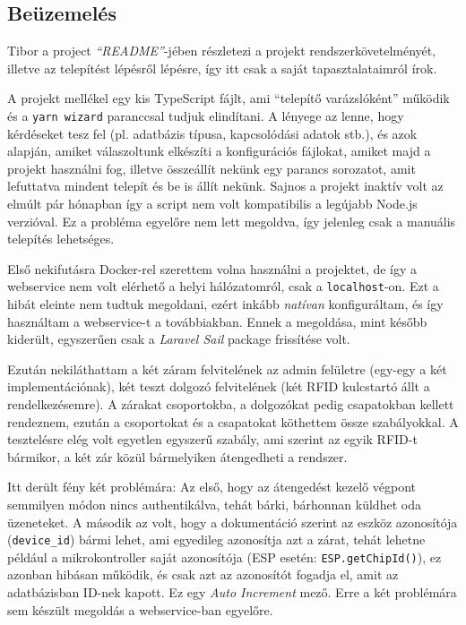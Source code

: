 \documentclass[
]{thesis-ekf}
\theoremstyle{definition}
\theoremstyle{remark}
\begin{document}
\subsection{Beüzemelés}
Tibor a project \emph{\enquote{README}}-jében részletezi a projekt rendszerkövetelményét, illetve az telepítést lépésről lépésre, így itt csak a saját tapasztalataimról írok.

A projekt mellékel egy kis TypeScript fájlt, ami \enquote{telepítő varázslóként} működik és a \texttt{yarn wizard} paranccsal tudjuk elindítani. A lényege az lenne, hogy kérdéseket tesz fel (pl. adatbázis típusa, kapcsolódási adatok stb.), és azok alapján, amiket válaszoltunk elkészíti a konfigurációs fájlokat, amiket majd a projekt használni fog, illetve összeállít nekünk egy parancs sorozatot, amit lefuttatva mindent telepít és be is állít nekünk. \cite{webservice-install} Sajnos a projekt inaktív volt az elmúlt pár hónapban így a script nem volt kompatibilis a legújabb Node.js verzióval. Ez a probléma egyelőre nem lett megoldva, így jelenleg csak a manuális telepítés lehetséges.

Első nekifutásra Docker-rel szerettem volna használni a projektet, de így a webservice nem volt elérhető a helyi hálózatomról, csak a \texttt{localhost}-on. Ezt a hibát eleinte nem tudtuk megoldani, ezért inkább \emph{natívan} konfiguráltam, és így használtam a webservice-t a továbbiakban. Ennek a megoldása, mint később kiderült, egyszerűen csak a \emph{Laravel Sail} package frissítése volt.

Ezután nekiláthattam a két záram felvitelének az admin felületre (egy-egy a két implementációnak), két teszt dolgozó felvitelének (két RFID kulcstartó állt a rendelkezésemre). A zárakat csoportokba, a dolgozókat pedig csapatokban kellett rendeznem, ezután a csoportokat és a csapatokat köthettem össze szabályokkal. A tesztelésre elég volt egyetlen egyszerű szabály, ami szerint az egyik RFID-t bármikor, a két zár közül bármelyiken átengedheti a rendszer.

Itt derült fény két problémára: Az első, hogy az átengedést kezelő végpont semmilyen módon nincs authentikálva, tehát bárki, bárhonnan küldhet oda üzeneteket. A második az volt, hogy a dokumentáció szerint az eszköz azonosítója (\texttt{device\_id}) bármi lehet, ami egyedileg azonosítja azt a zárat, tehát lehetne például a mikrokontroller saját azonosítója (ESP esetén: \texttt{ESP.getChipId()}\cite{esp-functions}), ez azonban hibásan működik, és csak azt az azonosítót fogadja el, amit az adatbázisban ID-nek kapott. Ez egy \emph{Auto Increment} mező. Erre a két problémára sem készült megoldás a webservice-ban egyelőre.
\end{document}
